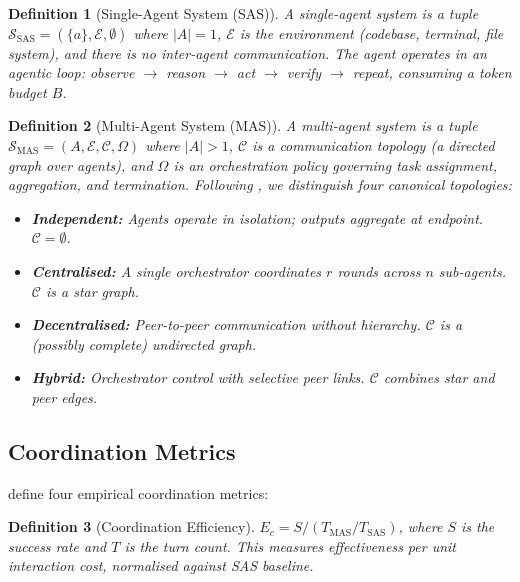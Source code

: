 \documentclass[11pt, a4paper, copyright]{googledeepmind}
\newtheorem{definition}{Definition}[section]
\begin{document}
\begin{definition}[Single-Agent System (SAS)]
A \emph{single-agent system} is a tuple $\mathcal{S}_{\text{SAS}} = (\{a\}, \mathcal{E}, \emptyset)$ where $|A| = 1$, $\mathcal{E}$ is the environment (codebase, terminal, file system), and there is no inter-agent communication. The agent operates in an agentic loop: \emph{observe $\to$ reason $\to$ act $\to$ verify $\to$ repeat}, consuming a token budget $B$.
\end{definition}

\begin{definition}[Multi-Agent System (MAS)]
A \emph{multi-agent system} is a tuple $\mathcal{S}_{\text{MAS}} = (A, \mathcal{E}, \mathcal{C}, \Omega)$ where $|A| > 1$, $\mathcal{C}$ is a \emph{communication topology} (a directed graph over agents), and $\Omega$ is an \emph{orchestration policy} governing task assignment, aggregation, and termination. Following \citet{kim2025scaling}, we distinguish four canonical topologies:
\begin{itemize}
    \item \textbf{Independent:} Agents operate in isolation; outputs aggregate at endpoint. $\mathcal{C} = \emptyset$.
    \item \textbf{Centralised:} A single orchestrator coordinates $r$ rounds across $n$ sub-agents. $\mathcal{C}$ is a star graph.
    \item \textbf{Decentralised:} Peer-to-peer communication without hierarchy. $\mathcal{C}$ is a (possibly complete) undirected graph.
    \item \textbf{Hybrid:} Orchestrator control with selective peer links. $\mathcal{C}$ combines star and peer edges.
\end{itemize}
\end{definition}

\subsection{Coordination Metrics}

\citet{kim2025scaling} define four empirical coordination metrics:

\begin{definition}[Coordination Efficiency]
$E_c = S / (T_{\text{MAS}} / T_{\text{SAS}})$, where $S$ is the success rate and $T$ is the turn count. This measures effectiveness per unit interaction cost, normalised against SAS baseline.
\end{definition}
\end{document}
